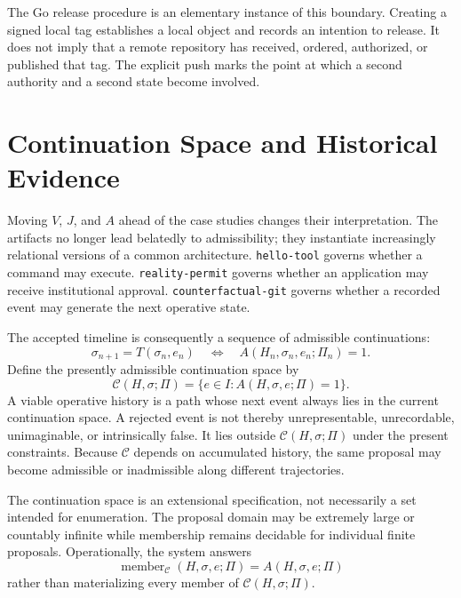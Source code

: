 \documentclass[11pt]{article}
\begin{document}
The Go release procedure is an elementary instance of this boundary. Creating a signed local tag establishes a local object and records an intention to release. It does not imply that a remote repository has received, ordered, authorized, or published that tag. The explicit push marks the point at which a second authority and a second state become involved.

\section{Continuation Space and Historical Evidence}

Moving $V$, $J$, and $A$ ahead of the case studies changes their interpretation. The artifacts no longer lead belatedly to admissibility; they instantiate increasingly relational versions of a common architecture. \texttt{hello-tool} governs whether a command may execute. \texttt{reality-permit} governs whether an application may receive institutional approval. \texttt{counterfactual-git} governs whether a recorded event may generate the next operative state.

The accepted timeline is consequently a sequence of admissible continuations:
\begin{equation}
  \sigma_{n+1}=T(\sigma_n,e_n)
  \quad\Longleftrightarrow\quad
  A(H_n,\sigma_n,e_n;\Pi_n)=1.
  \label{eq:continuation}
\end{equation}
Define the presently admissible continuation space by
\begin{equation}
  \boxed{\mathcal{C}(H,\sigma;\Pi)=
  \{e\in I:A(H,\sigma,e;\Pi)=1\}}.
  \label{eq:continuation-space}
\end{equation}
A viable operative history is a path whose next event always lies in the current continuation space. A rejected event is not thereby unrepresentable, unrecordable, unimaginable, or intrinsically false. It lies outside $\mathcal{C}(H,\sigma;\Pi)$ under the present constraints. Because $\mathcal{C}$ depends on accumulated history, the same proposal may become admissible or inadmissible along different trajectories.

The continuation space is an extensional specification, not necessarily a set intended for enumeration. The proposal domain may be extremely large or countably infinite while membership remains decidable for individual finite proposals. Operationally, the system answers
\begin{equation}
  \operatorname{member}_{\mathcal{C}}(H,\sigma,e;\Pi)
  =A(H,\sigma,e;\Pi)
  \label{eq:continuation-membership}
\end{equation}
rather than materializing every member of $\mathcal{C}(H,\sigma;\Pi)$.
\end{document}
